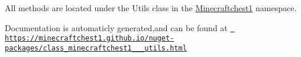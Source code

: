 \label{index_md_utils_README}%
%
 All methods are located under the {\ttfamily Utils} class in the {\ttfamily \mbox{\hyperlink{namespace_minecraftchest1}{Minecraftchest1}}} namespace.

Documentation is automaticly generated,and can be found at \href{https://minecraftchest1.github.io/nuget-packages/class_minecraftchest1_1_1_utils.html}{\texttt{ https\+://minecraftchest1.\+github.\+io/nuget-\/packages/class\+\_\+minecraftchest1\+\_\+\_\+\_\+utils.\+html}} 